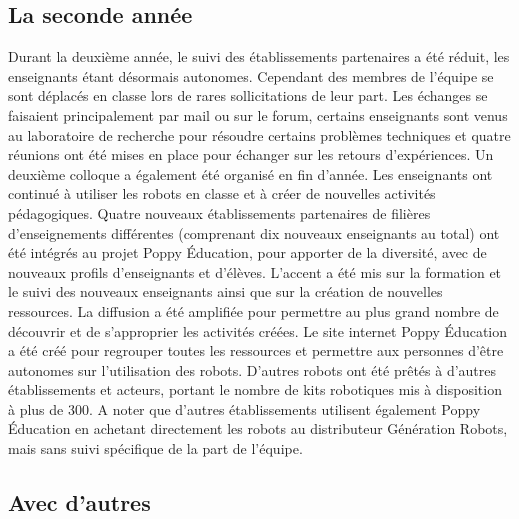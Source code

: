     \subsection{La seconde année}
        Durant la deuxième année, le suivi des établissements partenaires a été réduit, les enseignants étant désormais autonomes. Cependant des membres de l’équipe se sont déplacés en classe lors de rares sollicitations de leur part. Les échanges se faisaient principalement par mail ou sur le forum, certains enseignants sont venus au laboratoire de recherche pour résoudre certains problèmes techniques et quatre réunions ont été mises en place pour échanger sur les retours d’expériences. Un deuxième colloque  a également été organisé en fin d'année.
        Les enseignants ont continué à utiliser les robots en classe et à créer de nouvelles activités pédagogiques.
        Quatre nouveaux établissements partenaires de filières d’enseignements différentes (comprenant dix nouveaux enseignants au total) ont été intégrés au projet Poppy Éducation, pour apporter de la diversité, avec de nouveaux profils d’enseignants et d’élèves. 
        L’accent a été mis sur la formation et le suivi des nouveaux enseignants ainsi que sur la création de nouvelles ressources. La diffusion a été amplifiée pour permettre au plus grand nombre de découvrir et de s’approprier les activités créées. Le site internet Poppy Éducation a été créé pour regrouper toutes les ressources et permettre aux personnes d’être autonomes sur l'utilisation des robots.
        D'autres robots ont été prêtés à d'autres établissements et acteurs, portant le nombre de kits robotiques mis à disposition à plus de 300. A noter que d’autres établissements utilisent également Poppy Éducation en achetant directement les robots au distributeur Génération Robots, mais sans suivi spécifique de la part de l’équipe.
    \subsection{Avec d'autres}\label{sec:stand}
